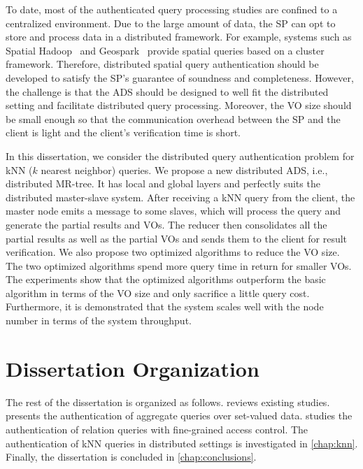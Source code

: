 To date, most of the authenticated query processing studies are confined to a centralized environment. Due to the large amount of data, the SP can opt to store and process data in a distributed framework. For example, systems such as Spatial Hadoop~\cite{10.1109/icde.2015.7113382} and Geospark~\cite{10.1145/2820783.2820860} provide spatial queries based on a cluster framework. Therefore, distributed spatial query authentication should be developed to satisfy the SP's guarantee of soundness and completeness. However, the challenge is that the ADS should be designed to well fit the distributed setting and facilitate distributed query processing. Moreover, the VO size should be small enough so that the communication overhead between the SP and the client is light and the client's verification time is short.

In this dissertation, we consider the distributed query authentication problem for kNN ($k$ nearest neighbor) queries. We propose a new distributed ADS, i.e., distributed MR-tree. It has local and global layers and perfectly suits the distributed master-slave system. After receiving a kNN query from the client, the master node emits a message to some slaves, which will process the query and generate the partial results and VOs. The reducer then consolidates all the partial results as well as the partial VOs and sends them to the client for result verification. We also propose two optimized algorithms to reduce the VO size. The two optimized algorithms spend more query time in return for smaller VOs. The experiments show that the optimized algorithms outperform the basic algorithm in terms of the VO size and only sacrifice a little query cost. Furthermore, it is demonstrated that the system scales well with the node number in terms of the system throughput.

\section{Dissertation Organization}

The rest of the dissertation is organized as follows.  reviews existing studies.  presents the authentication of aggregate queries over set-valued data.  studies the authentication of relation queries with fine-grained access control. The authentication of {kNN} queries in distributed settings is investigated in \cref{chap:knn}. Finally, the dissertation is concluded in \cref{chap:conclusions}.
